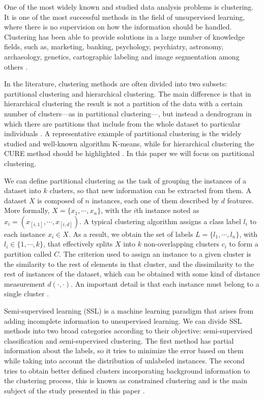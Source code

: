 \documentclass[review]{elsarticle}
\begin{document}
One of the most widely known and studied data analysis problems is clustering. It is one of the most successful methods in the field of unsupervised learning, where there is no supervision on how the information should be handled. Clustering has been able to provide solutions in a large number of knowledge fields, such as, marketing, banking, psychology, psychiatry, astronomy, archaeology, genetics, cartographic labeling and image segmentation among others \cite{Everitt:2009:CA:1538772, araujo2019improving, verma2016improved, aparajeeta2016modified, wang2018non}.

In the literature, clustering methods are often divided into two subsets: partitional clustering and hierarchical clustering. The main difference is that in hierarchical clustering the result is not a partition of the data with a certain number of clusters---as in partitional clustering---, but instead a dendrogram in which there are partitions that include from the whole dataset to particular individuals \cite{Everitt:2009:CA:1538772}. A representative example of partitional clustering is the widely studied and well-known algorithm K-means, while for hierarchical clustering the CURE method should be highlighted \cite{wu2009top, guha1998cure}. In this paper we will focus on partitional clustering.

We can define partitional clustering as the task of grouping the instances of a dataset into $k$ clusters, so that new information can be extracted from them. A dataset $X$ is composed of $n$ instances, each one of them described by $d$ features. More formally, $X = \{x_1, \cdots, x_n\}$, with the $i$th instance noted as $x_i = (x_{[i,1]}, \cdots, x_{[i,d]})$. A typical clustering algorithm assigns a class label $l_i$ to each instance $x_i \in X$. As a result, we obtain the set of labels $L = \{l_1, \cdots, l_n\}$, with $l_i \in \{1, \cdots, k\}$, that effectively splits $X$ into $k$ non-overlapping clusters $c_i$ to form a partition called $C$. The criterion used to assign an instance to a given cluster is the similarity to the rest of elements in that cluster, and the dissimilarity to the rest of instances of the dataset, which can be obtained with some kind of distance measurement $d(\cdot, \cdot)$. An important detail is that each instance must belong to a single cluster \cite{jain1999data}. 

Semi-supervised learning (SSL) is a machine learning paradigm that arises from adding incomplete information to unsupervised learning. We can divide SSL methods into two broad categories according to their objective: semi-supervised classification and semi-supervised clustering. The first method has partial information about the labels, so it tries to minimize the error based on them while taking into account the distribution of unlabeled instances. The second tries to obtain better defined clusters incorporating background information to the clustering process, this is known as constrained clustering and is the main subject of the study presented in this paper \cite{chapelle2009semi, triguero2015self}. 
\end{document}
